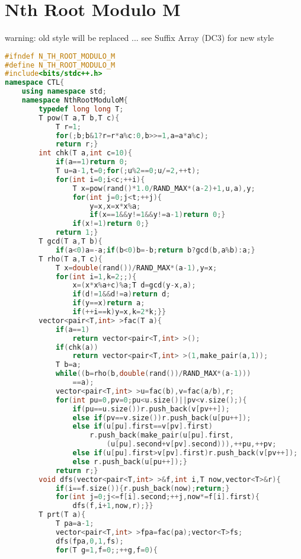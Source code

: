 \documentclass{book}
\begin{document}
\section{Nth Root Modulo M}
warning: old style will be replaced ... see Suffix Array (DC3) for new style\begin{lstlisting}[language=C++,title={Nth Root Modulo M.hpp (4098 bytes, 97 lines)}]
#ifndef N_TH_ROOT_MODULO_M
#define N_TH_ROOT_MODULO_M
#include<bits/stdc++.h>
namespace CTL{
    using namespace std;
    namespace NthRootModuloM{
        typedef long long T;
        T pow(T a,T b,T c){
            T r=1;
            for(;b;b&1?r=r*a%c:0,b>>=1,a=a*a%c);
            return r;}
        int chk(T a,int c=10){
            if(a==1)return 0;
            T u=a-1,t=0;for(;u%2==0;u/=2,++t);
            for(int i=0;i<c;++i){
                T x=pow(rand()*1.0/RAND_MAX*(a-2)+1,u,a),y;
                for(int j=0;j<t;++j){
                    y=x,x=x*x%a;
                    if(x==1&&y!=1&&y!=a-1)return 0;}
                if(x!=1)return 0;}
            return 1;}
        T gcd(T a,T b){
            if(a<0)a=-a;if(b<0)b=-b;return b?gcd(b,a%b):a;}
        T rho(T a,T c){
            T x=double(rand())/RAND_MAX*(a-1),y=x;
            for(int i=1,k=2;;){
                x=(x*x%a+c)%a;T d=gcd(y-x,a);
                if(d!=1&&d!=a)return d;
                if(y==x)return a;
                if(++i==k)y=x,k=2*k;}}
        vector<pair<T,int> >fac(T a){
            if(a==1)
                return vector<pair<T,int> >();
            if(chk(a))
                return vector<pair<T,int> >(1,make_pair(a,1));
            T b=a;
            while((b=rho(b,double(rand())/RAND_MAX*(a-1)))
                ==a);
            vector<pair<T,int> >u=fac(b),v=fac(a/b),r;
            for(int pu=0,pv=0;pu<u.size()||pv<v.size();){
                if(pu==u.size())r.push_back(v[pv++]);
                else if(pv==v.size())r.push_back(u[pu++]);
                else if(u[pu].first==v[pv].first)
                    r.push_back(make_pair(u[pu].first,
                        (u[pu].second+v[pv].second))),++pu,++pv;
                else if(u[pu].first>v[pv].first)r.push_back(v[pv++]);
                else r.push_back(u[pu++]);}
            return r;}
        void dfs(vector<pair<T,int> >&f,int i,T now,vector<T>&r){
            if(i==f.size()){r.push_back(now);return;}
            for(int j=0;j<=f[i].second;++j,now*=f[i].first){
                dfs(f,i+1,now,r);}}
        T prt(T a){
            T pa=a-1;
            vector<pair<T,int> >fpa=fac(pa);vector<T>fs;
            dfs(fpa,0,1,fs);
            for(T g=1,f=0;;++g,f=0){

\end{lstlisting}
\end{document}
